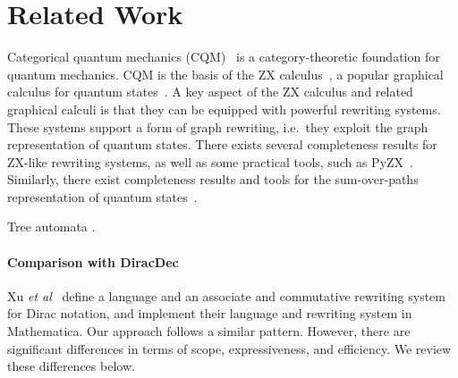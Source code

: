 \section{Related Work}
Categorical quantum mechanics (CQM)~\cite{DBLP:conf/lics/AbramskyC04}
is a category-theoretic foundation for quantum mechanics. CQM is the
basis of the ZX calculus~\cite{DBLP:conf/icalp/CoeckeD08}, a popular
graphical calculus for quantum states~\cite{vandewetering2020zx}. A
key aspect of the ZX calculus and related graphical calculi is that
they can be equipped with powerful rewriting systems. These systems
support a form of graph rewriting, i.e.\, they exploit the graph
representation of quantum states. There exists several completeness
results for ZX-like rewriting systems, as well as some practical
tools, such as PyZX~\cite{kissinger2019pyzx}. Similarly, there exist
completeness results and tools for the sum-over-paths representation
of quantum states~\cite{amy2018towards,amy2023complete}.

Tree automata \cite{AutoQ2023,AutoQ_pldi_2023,AutoQ_popl2025}.

\paragraph*{Comparison with DiracDec~\cite{diracdec}}
Xu \emph{et al}~\cite{diracdec} define a language and an associate and
commutative rewriting system for Dirac notation, and implement their
language and rewriting system in Mathematica. Our approach follows a
similar pattern. However, there are significant differences in terms
of scope, expressiveness, and efficiency. We review these differences
below.

